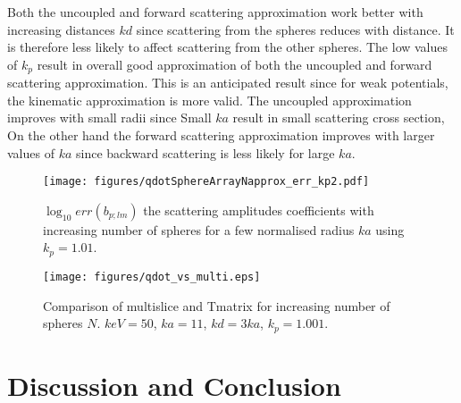 Both the uncoupled and forward scattering approximation work better with increasing distances $kd$ since scattering from the spheres reduces with distance. It is therefore less likely to affect scattering from the other spheres.
The low values of $k_p$ result in overall good approximation of both the uncoupled and forward scattering approximation. This is an anticipated result since for weak potentials, the kinematic approximation is more valid.
The uncoupled approximation improves with small radii since Small $ka$ result in small scattering cross section,
On the other hand the forward scattering approximation improves with larger values of $ka$ since backward scattering is less likely for large $ka$.

\begin{figure}
  \centering
    \texttt{[image: figures/qdotSphereArrayNapprox\_err\_kp2.pdf]}
  \caption{$\log_{10}err(b_{p;lm})$ the scattering amplitudes coefficients
  with increasing number of spheres for a few normalised radius $ka$
  using $k_p=1.01$.
}\label{fig:TmatrixApproxErr}
\end{figure}


\begin{figure}
  \centering
    \texttt{[image: figures/qdot\_vs\_multi.eps]}
  \caption{Comparison of multislice and Tmatrix for increasing number of
  spheres $N$. $keV=50$, $ka=11$, $kd=3ka$, $k_p=1.001$.
}\label{fig:MSvsTmatrix}
\end{figure}





\section{Discussion and Conclusion }

